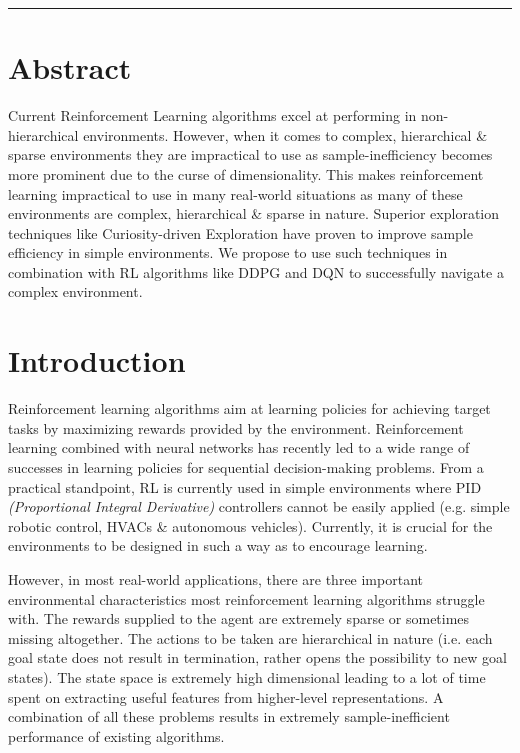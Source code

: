 \documentclass[12pt,a4paper]{article}
\begin{document}
\reviewtitle
\hrule

\section{Abstract}
Current Reinforcement Learning algorithms excel at performing in
non-hierarchical environments. However, when it comes to complex,
hierarchical \& sparse environments  they are impractical to use 
as sample-inefficiency becomes more prominent due to the curse of
dimensionality. This makes reinforcement learning impractical to 
use in many real-world situations as many  of these environments are 
complex, hierarchical \& sparse in  nature. Superior exploration techniques 
like Curiosity-driven Exploration have proven to improve sample efficiency 
in simple environments. We propose to use such techniques in combination 
with RL algorithms like DDPG and DQN to successfully navigate a complex 
environment.

\section{Introduction}
Reinforcement learning algorithms aim at learning policies for achieving 
target tasks by maximizing rewards provided by the environment. Reinforcement
learning combined with neural networks has recently led to a wide range of 
successes in learning policies for sequential decision-making problems. From a
practical standpoint, RL is currently used in simple environments where PID 
\textit{(Proportional Integral Derivative)} controllers cannot be easily applied
(e.g. simple robotic control, HVACs \& autonomous vehicles). Currently, 
it is crucial for the environments to be designed in such a way as to encourage 
learning.

However, in most real-world applications, there are three important environmental
characteristics most reinforcement learning algorithms struggle with. The 
rewards supplied to the agent are extremely sparse or sometimes missing 
altogether. The actions  to be taken are hierarchical in nature (i.e. 
each goal state does not result in termination, rather opens the possibility 
to new goal states). The state space is extremely high dimensional leading 
to a lot of time spent on extracting useful features from higher-level 
representations. A combination of all these problems results in extremely 
sample-inefficient performance of existing algorithms.
\end{document}
